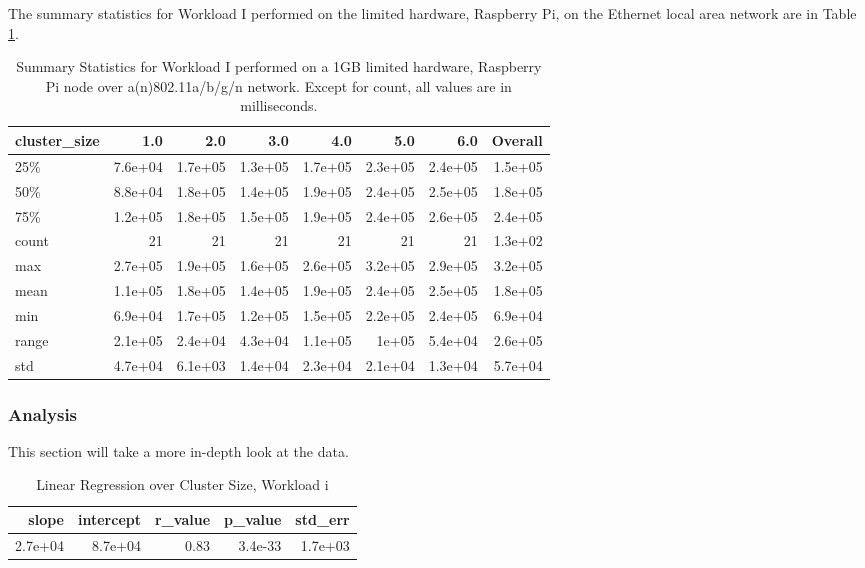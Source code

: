 The summary statistics for Workload I performed on the limited hardware, Raspberry Pi, on the Ethernet local area network are in Table \ref{table:summary_table_i_1GB_rp_wlan}.
\begin{table}
\begin{tabular}{lrrrrrrr}
\toprule
cluster\_size &     1.0 &     2.0 &     3.0 &     4.0 &     5.0 &     6.0 &  Overall \\
\midrule
25\%   & 7.6e+04 & 1.7e+05 & 1.3e+05 & 1.7e+05 & 2.3e+05 & 2.4e+05 &  1.5e+05 \\
50\%   & 8.8e+04 & 1.8e+05 & 1.4e+05 & 1.9e+05 & 2.4e+05 & 2.5e+05 &  1.8e+05 \\
75\%   & 1.2e+05 & 1.8e+05 & 1.5e+05 & 1.9e+05 & 2.4e+05 & 2.6e+05 &  2.4e+05 \\
count &      21 &      21 &      21 &      21 &      21 &      21 &  1.3e+02 \\
max   & 2.7e+05 & 1.9e+05 & 1.6e+05 & 2.6e+05 & 3.2e+05 & 2.9e+05 &  3.2e+05 \\
mean  & 1.1e+05 & 1.8e+05 & 1.4e+05 & 1.9e+05 & 2.4e+05 & 2.5e+05 &  1.8e+05 \\
min   & 6.9e+04 & 1.7e+05 & 1.2e+05 & 1.5e+05 & 2.2e+05 & 2.4e+05 &  6.9e+04 \\
range & 2.1e+05 & 2.4e+04 & 4.3e+04 & 1.1e+05 &   1e+05 & 5.4e+04 &  2.6e+05 \\
std   & 4.7e+04 & 6.1e+03 & 1.4e+04 & 2.3e+04 & 2.1e+04 & 1.3e+04 &  5.7e+04 \\
\bottomrule
\end{tabular}
\caption{Summary Statistics for Workload I performed on a 1GB limited hardware, Raspberry Pi node over a(n)802.11a/b/g/n network.  Except for count, all values are in milliseconds.}
\label{table:summary_table_i_1GB_rp_wlan}
\end{table}



\subsubsection{Analysis}
This section will take a more in-depth look at the data.


\begin{table}[H]
\centering
\begin{tabular}{rrrrr}
\toprule
  slope &  intercept &  r\_value &  p\_value &  std\_err \\
\midrule
2.7e+04 &    8.7e+04 &     0.83 &  3.4e-33 &  1.7e+03 \\
\bottomrule
\end{tabular}
\caption{Linear Regression over Cluster Size, Workload i}
\label{table:wlan_only_i}
\end{table}



